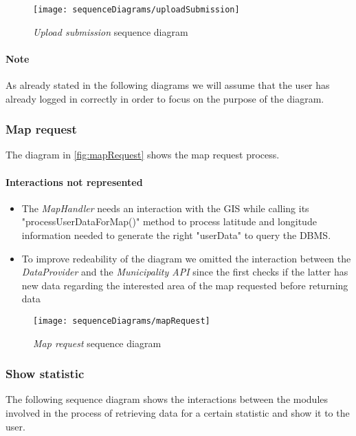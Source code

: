 	\begin{figure}[h!]
		\centering
		\texttt{[image: sequenceDiagrams/uploadSubmission]}
		\caption{
			\label{fig:uploadSubmission} 
			\emph{Upload submission} sequence diagram
		}
	\end{figure}
	\clearpage

\paragraph{Note} As already stated in the following diagrams we will assume that the user has already logged in correctly
	in order to focus on the purpose of the diagram.\\

\subsubsection{Map request}
The diagram in \autoref{fig:mapRequest} shows the map request process.\\

\paragraph{Interactions not represented}
\begin{itemize}
\item The \emph{MapHandler} needs an interaction with the GIS while calling its "processUserDataForMap()" method	
	to process latitude and longitude information needed to generate the right "userData" to query the DBMS. 
\item To improve redeability of the diagram we omitted the interaction between the \emph{DataProvider} and the 
	\emph{Municipality API} since the first checks if the latter has new data regarding the interested area of the 
	map requested before returning data
\end{itemize}

\begin{figure}[h!]  
	\centering
	\texttt{[image: sequenceDiagrams/mapRequest]}
	\caption{
		\label{fig:mapRequest} 
		\emph{Map request} sequence diagram
	}
\end{figure}

\clearpage
\subsubsection{Show statistic}
The following sequence diagram shows the interactions between the modules involved in the process of retrieving data
for a certain statistic and show it to the user.\\

